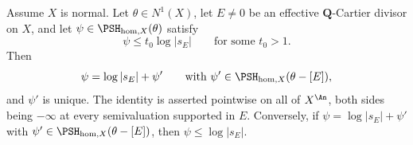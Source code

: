 \begin{theorem}
\label{thm:ch35-homogeneous-siu}
Assume $X$ is normal.  Let $\theta\in N^1(X)$, let $E\neq0$ be an
effective $\mathbf Q$-Cartier divisor on $X$, and let
$\psi\in\PSH_{\mathrm{hom},X}(\theta)$ satisfy
\begin{equation}
\label{eq:ch35-siu-strict-hypothesis}
 \psi\leq t_0\log|s_E|\qquad\text{for some }t_0>1 .
\end{equation}
Then
\begin{equation}
\label{eq:ch35-homogeneous-siu}
 \psi=\log|s_E|+\psi'
 \qquad\text{with }\psi'\in\PSH_{\mathrm{hom},X}(\theta-[E]),
\end{equation}
and $\psi'$ is unique.  The identity is asserted pointwise on all of
$X^{\An}$, both sides being $-\infty$ at every semivaluation supported
in $E$.  Conversely, if $\psi=\log|s_E|+\psi'$ with
$\psi'\in\PSH_{\mathrm{hom},X}(\theta-[E])$, then
$\psi\leq\log|s_E|$.
\end{theorem}

